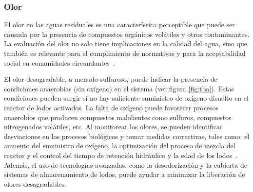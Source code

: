 \subsubsection{Olor}
El olor en las aguas residuales es una característica perceptible que puede ser causada por la presencia de compuestos orgánicos volátiles y otros contaminantes. La evaluación del olor no solo tiene implicaciones en la calidad del agua, sino que también es relevante para el cumplimiento de normativas y para la aceptabilidad social en comunidades circundantes~\citep{metcalf2003}.\par
El olor desagradable, a menudo sulfuroso, puede indicar la presencia de condiciones anaerobias (sin oxígeno) en el sistema (ver figura \ref{fig:tba}). Estas condiciones pueden surgir si no hay suficiente suministro de oxígeno disuelto en el reactor de lodos activados. La falta de oxígeno puede favorecer procesos anaerobios que producen compuestos malolientes como sulfuros, compuestos nitrogenados volátiles, etc. Al monitorear los olores, se pueden identificar desviaciones en los procesos biológicos y tomar medidas correctivas, tales como: el aumento del suministro de oxígeno, la optimización del proceso de mezcla del reactor y el control del tiempo de retención hidráulico y la edad de los lodos~\citep{lazcano2016}. Además, el uso de tecnologías avanzadas, como la desodorización y la cubierta de sistemas de almacenamiento de lodos, puede ayudar a minimizar la liberación de olores desagradables.
